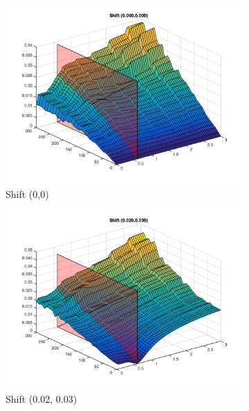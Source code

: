 \begin{figure}[!ht]
	\centering
	\begin{subfigure}{0.45\textwidth}
	\includegraphics[width=1\textwidth]{Results/ErrorByBlurAndNoiseForShift1}
	\caption{Shift (0,0)}
	\end{subfigure}	
	\begin{subfigure}{0.45\textwidth}
	\includegraphics[width=1\textwidth]{Results/ErrorByBlurAndNoiseForShift2}
	\caption{Shift (0.02, 0.03)}
	\end{subfigure}	
	\quad
	\begin{subfigure}{0.45\textwidth}

\end{subfigure}
\end{figure}

